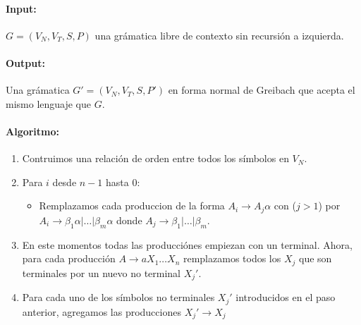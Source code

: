 \paragraph{Input:} \(G = (V_N, V_T, S, P)\) una grámatica libre de contexto sin recursión a izquierda.

\paragraph{Output:} Una grámatica \(G' = (V_N, V_T, S, P')\) en forma normal de Greibach que acepta el mismo lenguaje que \(G\).

\paragraph{Algoritmo:}
\begin{enumerate}
  \item Contruimos una relación de orden entre todos los símbolos en \(V_N\).
  \item Para \(i\) desde \(n-1\) hasta 0:
        \begin{itemize}
          \item[] Remplazamos cada produccion de la forma \(A_i\to A_j\alpha\) con (\(j > 1\)) por \(A_i\to\beta_1\alpha|\dots|\beta_m\alpha\) donde \(A_j\to\beta_1|\dots|\beta_m\).
        \end{itemize}
  \item En este momentos todas las producciónes empiezan con un terminal. Ahora, para cada producción \(A\to aX_1\dots X_n\) remplazamos todos los \(X_j\) que son terminales por un nuevo no terminal \(X_j'\).
  \item Para cada uno de los símbolos no terminales \(X_j'\) introducidos en el paso anterior, agregamos las producciones \(X_j'\to X_j\)
\end{enumerate}